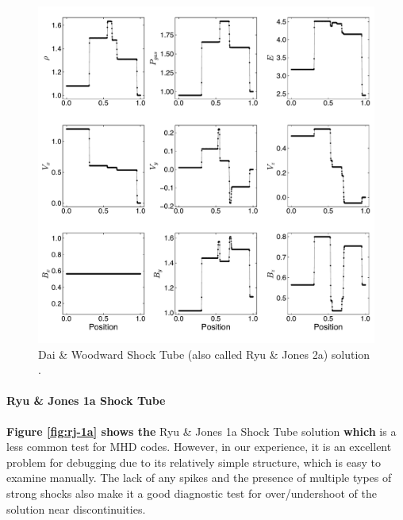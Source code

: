 \documentclass[modern, linenumbers]{aastex631}
\newcommand*{\img}[1]{%
    \raisebox{-.05\baselineskip}{%
        \texttt{[image: \#1]}%
    }%
}
\begin{document}
\begin{figure}[ht!]
    \includegraphics[width=\linewidth]{d-and-w.pdf}
    \caption{Dai \& Woodward Shock Tube (also called Ryu \& Jones 2a) solution \citep{dai_woodward_1998, ryu_jones_1995}.
    \href{https://zenodo.org/records/10927223}{\img{zenodo-gradient-200.png}}}
    \label{fig:dai-and-woodward}
\end{figure}

\paragraph{Ryu \& Jones 1a Shock Tube}
\textbf{Figure \ref{fig:rj-1a} shows the} Ryu \& Jones 1a Shock Tube solution \citep{ryu_jones_1995} \textbf{which} is a less common test for MHD codes. However, in our experience, it is an excellent problem for debugging due to its relatively simple structure, which is easy to examine manually. The lack of any spikes and the presence of multiple types of strong shocks also make it a good diagnostic test for over/undershoot of the solution near discontinuities.
\end{document}
